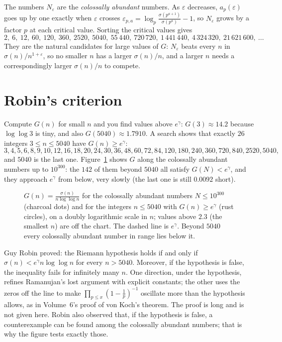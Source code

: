 The numbers $N_\varepsilon$ are the \emph{colossally abundant} numbers. As $\varepsilon$ decreases, $a_p(\varepsilon)$ goes up by one exactly when $\varepsilon$ crosses
$\varepsilon_{p,a}=\log_p\frac{\sigma(p^{a+1})}{\sigma(p^a)}-1$, so $N_\varepsilon$ grows by a factor $p$ at each critical value. Sorting the critical values gives
\[
2,\ 6,\ 12,\ 60,\ 120,\ 360,\ 2520,\ 5040,\ 55\,440,\ 720\,720,\ 1\,441\,440,\ 4\,324\,320,\ 21\,621\,600,\ \dots
\]
They are the natural candidates for large values of $G$: $N_\varepsilon$ beats every $n$ in $\sigma(n)/n^{1+\varepsilon}$, so no smaller $n$ has a larger $\sigma(n)/n$,
and a larger $n$ needs a correspondingly larger $\sigma(n)/n$ to compete.

\section{Robin's criterion}

Compute $G(n)$ for small $n$ and you find values above $e^\gamma$: $G(3)\approx14.2$ because $\log\log3$ is tiny, and also $G(5040)\approx1.7910$. A
search shows that exactly $26$ integers $3\le n\le5040$ have $G(n)\ge e^\gamma$:
\[
3,4,5,6,8,9,10,12,16,18,20,24,30,36,48,60,72,84,120,180,240,360,720,840,2520,5040,
\]
and $5040$ is the last one. Figure~\ref{conjectures:fig:robin} shows $G$ along the colossally abundant numbers up to $10^{300}$: the $142$ of them beyond $5040$ all
satisfy $G(N)<e^\gamma$, and they approach $e^\gamma$ from below, very slowly (the last one is still $0.0092$ short).

\begin{figure}[ht]
\centering
{}
\caption{$G(n)=\frac{\sigma(n)}{n\log\log n}$ for the colossally abundant numbers $N\le10^{300}$ (charcoal dots) and for the integers $n\le5040$ with $G(n)\ge e^\gamma$
(rust circles), on a doubly logarithmic scale in $n$; values above $2.3$ (the smallest $n$) are off the chart. The dashed line is $e^\gamma$. Beyond
$5040$ every colossally abundant number in range lies below it.}
\label{conjectures:fig:robin}
\end{figure}

\begin{remark}[Robin, 1984]\label{conjectures:rem:robin}
Guy Robin proved: the Riemann hypothesis holds if and only if $\sigma(n)<e^\gamma n\log\log n$ for every $n>5040$. Moreover, if the hypothesis is false,
the inequality fails for infinitely many $n$. One direction, under the hypothesis, refines Ramanujan's lost argument with explicit constants; the other
uses the zeros off the line to make $\prod_{p\le x}(1-\frac1p)^{-1}$ oscillate more than the hypothesis allows, as in Volume~6's proof of von Koch's
theorem. The proof is long and is not given here. Robin also observed that, if the hypothesis is false, a counterexample can be found among the
colossally abundant numbers; that is why the figure tests exactly those.
\end{remark}

